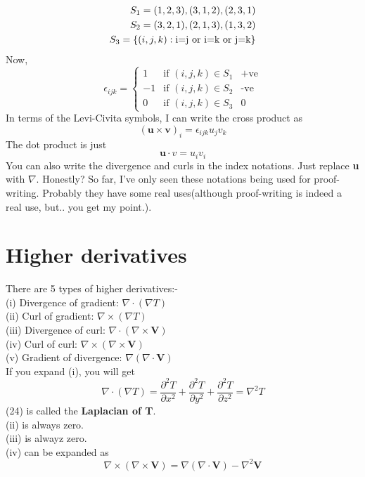 \documentclass[12pt]{article}
\begin{document}
\begin{align}
    S_1 = {(1,2,3),(3,1,2),(2,3,1)}\notag\\
    S_2 = {(3,2,1),(2,1,3),(1,3,2)}\notag\\
    S_3 = \{(i,j,k): \text{i=j  or i=k or j=k}\}\notag\\
\end{align}
Now, 
\[
\epsilon_{ijk} = \left\{ 
\begin{array}{lll}
   1 & \text{if } (i,j,k) \in S_1 & \text{+ve} \\
   -1   & \text{if } (i,j,k) \in S_2 & \text{-ve} \\
   0  & \text{if } (i,j,k) \in S_3 & \text{0}
\end{array} 
\right.
\]
In terms of the Levi-Civita symbols, I can write the cross product as 
\begin{equation}
    (\mathbf{u}\times\mathbf{v})_i = \epsilon_{ijk}u_jv_k
\end{equation}
The dot product is just 
\begin{equation}
    \mathbf{u}\cdot{v}=u_iv_i
\end{equation}
You can also write the divergence and curls in the index notations. Just replace \textbf{u} with $\nabla$.
Honestly? So far, I've only seen these notations being used for proof-writing. Probably they have some real uses(although proof-writing is indeed a real use, but.. you get my point.).
\section{Higher derivatives}

There are 5 types of higher derivatives:-\vspace{0.3cm}\\
(i) Divergence of gradient: $\nabla \cdot (\nabla T)$ \\
(ii) Curl of gradient: $\nabla \times (\nabla T)$ \\
(iii) Divergence of curl: $\nabla \cdot (\nabla \times \mathbf{V})$ \\
(iv) Curl of curl: $\nabla \times (\nabla \times \mathbf{V})$ \\
(v) Gradient of divergence: $\nabla(\nabla\cdot \mathbf{V})$ \vspace{0.3cm}\\
If you expand (i), you will get
\begin{equation}
    \nabla \cdot (\nabla T)=\frac{\partial^2T}{\partial x^2}+\frac{\partial^2T}{\partial y^2}+\frac{\partial^2T}{\partial z^2}=\nabla^2 T
\end{equation}
(24) is called the \textbf{Laplacian of T}. \\
(ii) is always zero. \\
(iii) is alwayz zero. \\
(iv) can be expanded as 
\begin{equation}
    \nabla \times (\nabla \times \mathbf{V})=\nabla(\nabla \cdot \mathbf{V})-\nabla^2 \mathbf{V}
\end{equation}
\end{document}
